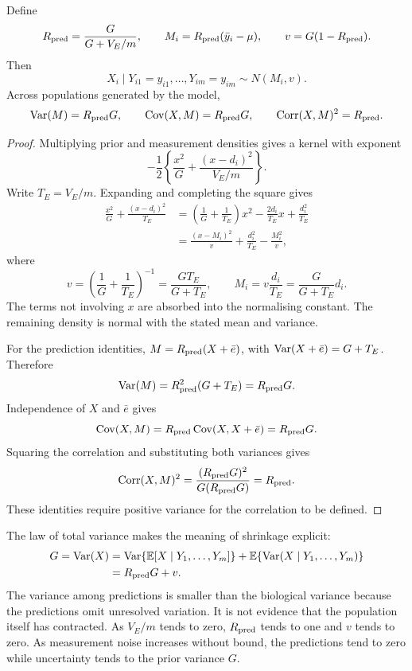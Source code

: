 \begin{proposition}
\label{estimation:posterior}
Define
\[
 R_{\rm pred}=\frac{G}{G+V_E/m},\qquad
 M_i=R_{\rm pred}(\bar y_i-\mu),\qquad
 v=G(1-R_{\rm pred}).
\]
Then
\begin{equation}
 X_i\mid Y_{i1}=y_{i1},\ldots,Y_{im}=y_{im}
 \sim N(M_i,v).
 \label{estimation:posterior_formula}
\end{equation}
Across populations generated by the model,
\begin{equation}
 \operatorname{Var}(M)=R_{\rm pred}G,\qquad
 \operatorname{Cov}(X,M)=R_{\rm pred}G,\qquad
 \operatorname{Corr}(X,M)^2=R_{\rm pred}.
 \label{estimation:reliability_identities}
\end{equation}
\end{proposition}

\begin{proof}
Multiplying prior and measurement densities gives a kernel with exponent
\[
 -\frac12\left\{\frac{x^2}{G}
      +\frac{(x-d_i)^2}{V_E/m}\right\}.
\]
Write \(T_E=V_E/m\). Expanding and completing the square gives
\begin{align*}
 \frac{x^2}{G}+\frac{(x-d_i)^2}{T_E}
 &=\left(\frac1G+\frac1{T_E}\right)x^2
   -\frac{2d_i}{T_E}x+\frac{d_i^2}{T_E}\\
 &=\frac{(x-M_i)^2}{v}
   +\frac{d_i^2}{T_E}-\frac{M_i^2}{v},
\end{align*}
where
\[
 v=\left(\frac1G+\frac1{T_E}\right)^{-1}
   =\frac{GT_E}{G+T_E},
 \qquad
 M_i=v\frac{d_i}{T_E}
   =\frac{G}{G+T_E}d_i.
\]
The terms not involving \(x\) are absorbed into the normalising constant.
The remaining density is normal with the stated mean and variance.

For the prediction identities, \(M=R_{\rm pred}(X+\bar e)\), with
\(\operatorname{Var}(X+\bar e)=G+T_E\). Therefore
\[
 \operatorname{Var}(M)=R_{\rm pred}^2(G+T_E)=R_{\rm pred}G.
\]
Independence of \(X\) and \(\bar e\) gives
\[
 \operatorname{Cov}(X,M)=R_{\rm pred}\operatorname{Cov}(X,X+\bar e)=R_{\rm pred}G.
\]
Squaring the correlation and substituting both variances gives
\[
 \operatorname{Corr}(X,M)^2
 =\frac{(R_{\rm pred}G)^2}{G(R_{\rm pred}G)}
 =R_{\rm pred}.
\]
These identities require positive variance for the correlation to be defined.
\end{proof}

The law of total variance makes the meaning of shrinkage explicit:
\begin{align}
 G=\operatorname{Var}(X)
 &=\operatorname{Var}\{\mathbb E[X\mid Y_1,\ldots,Y_m]\}
   +\mathbb E\{\operatorname{Var}(X\mid Y_1,\ldots,Y_m)\}\nonumber\\
 &=R_{\rm pred}G+v.
 \label{estimation:total_variance}
\end{align}
The variance among predictions is smaller than the biological variance because
the predictions omit unresolved variation. It is not evidence that the
population itself has contracted. As \(V_E/m\) tends to zero,
\(R_{\rm pred}\) tends to one and \(v\) tends to zero. As measurement noise
increases without bound, the predictions tend to zero while uncertainty tends
to the prior variance \(G\).

